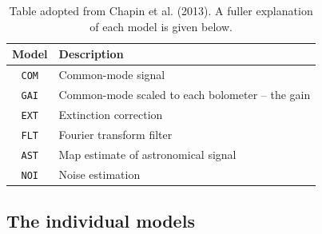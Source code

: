 \documentclass[twoside,11pt]{article}
\newcommand{\xlabel}[1]{}
\renewcommand{\_}{\texttt{\symbol{95}}}
\begin{document}
\begin{htmlonly}
\setlength{\extrarowheight}{3pt}
\begin{table}
\centering
\begin{tabular}{c|l}
\hline
\textbf{Model} &\hspace{0.2cm} \textbf{Description} \\
\hline
\texttt{COM}&\hspace{0.2cm} Common-mode signal\\
\texttt{GAI}&\hspace{0.2cm} Common-mode scaled to each bolometer -- the gain\\
\texttt{EXT}&\hspace{0.2cm} Extinction correction\\
\texttt{FLT}&\hspace{0.2cm} Fourier transform filter\\
\texttt{AST}&\hspace{0.2cm} Map estimate of astronomical signal\\
\texttt{NOI}&\hspace{0.2cm} Noise estimation\\
\hline
\end{tabular}
\label{tab:mods}
\caption{\small Table adopted from Chapin et al. (2013). A fuller
explanation of each model is given below.}
\end{table}
\end{htmlonly}

\raggedbottom
\subsection{\xlabel{models}The individual models}
\label{sec:models}
\end{document}
